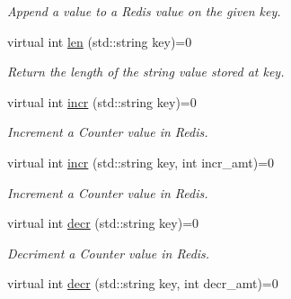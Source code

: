 \begin{DoxyCompactItemize}
\begin{DoxyCompactList}\small\item\em Append a value to a Redis value on the given key. \end{DoxyCompactList}\item 
virtual int \hyperlink{classRedisInterface_ad52034f760e2c197e1c34ff18f72dfc4}{len} (std\+::string key)=0\hypertarget{classRedisInterface_ad52034f760e2c197e1c34ff18f72dfc4}{}\label{classRedisInterface_ad52034f760e2c197e1c34ff18f72dfc4}

\begin{DoxyCompactList}\small\item\em Return the length of the string value stored at key. \end{DoxyCompactList}\item 
virtual int \hyperlink{classRedisInterface_a175deb36b92a98e497ee3d065d3327ea}{incr} (std\+::string key)=0\hypertarget{classRedisInterface_a175deb36b92a98e497ee3d065d3327ea}{}\label{classRedisInterface_a175deb36b92a98e497ee3d065d3327ea}

\begin{DoxyCompactList}\small\item\em Increment a Counter value in Redis. \end{DoxyCompactList}\item 
virtual int \hyperlink{classRedisInterface_a6299f2e405bb474333efc990c22b1765}{incr} (std\+::string key, int incr\+\_\+amt)=0\hypertarget{classRedisInterface_a6299f2e405bb474333efc990c22b1765}{}\label{classRedisInterface_a6299f2e405bb474333efc990c22b1765}

\begin{DoxyCompactList}\small\item\em Increment a Counter value in Redis. \end{DoxyCompactList}\item 
virtual int \hyperlink{classRedisInterface_a2147447af614a2c59f69a7b9ef3f5f2a}{decr} (std\+::string key)=0\hypertarget{classRedisInterface_a2147447af614a2c59f69a7b9ef3f5f2a}{}\label{classRedisInterface_a2147447af614a2c59f69a7b9ef3f5f2a}

\begin{DoxyCompactList}\small\item\em Decriment a Counter value in Redis. \end{DoxyCompactList}\item 
virtual int \hyperlink{classRedisInterface_ac25ea101a43a9e6cf48d4b40009aedec}{decr} (std\+::string key, int decr\+\_\+amt)=0\hypertarget{classRedisInterface_ac25ea101a43a9e6cf48d4b40009aedec}{}\label{classRedisInterface_ac25ea101a43a9e6cf48d4b40009aedec}


\end{DoxyCompactItemize}
